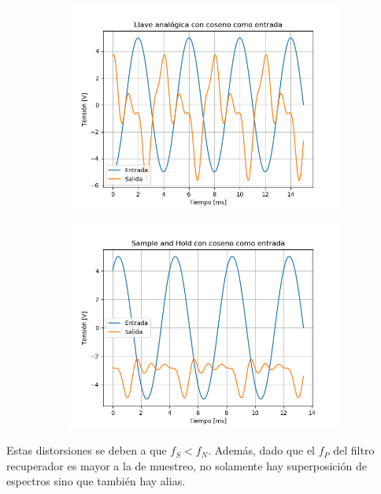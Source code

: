 \begin{figure}[H]
	\begin{subfigure}{.5\textwidth}
	\centering
	\includegraphics[width=\textwidth]{ImagenesEjercicio6/puntoc-d/LA - Cos.png}
	\end{subfigure}
	\begin{subfigure}{.5\textwidth}
	\centering
	\includegraphics[width=\textwidth]{ImagenesEjercicio6/puntoc-d/SH - Cos.png}
	\end{subfigure}
\end{figure}

Estas distorsiones se deben a que $f_S < f_N$. Además, dado que el $f_P$ del filtro recuperador es mayor a la de muestreo, no solamente hay superposición de espectros sino que también hay alias.

